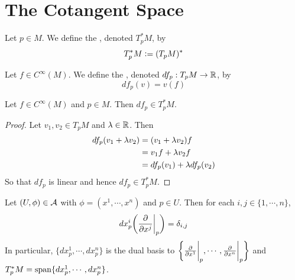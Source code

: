 \documentclass{book}
\begin{document}
	
	
	
	
	
	
	
	
	
	
	
	
	
	
	\newpage
	\section{The Cotangent Space}	
	
	
	\begin{defn}
	Let $p \in M$. We define the , denoted $T^*_pM$, by $$T^*_pM \vcentcolon= (T_pM)^*$$
	\end{defn}
	
	\begin{defn}
	Let $f \in C^{\infty}(M)$. We define the , denoted $df_p:T_pM \rightarrow \mathbb{R}$, by $$df_p(v) = v(f)$$
	\end{defn}
	
	\begin{ex}
	Let $f \in C^{\infty}(M)$ and $p \in M$. Then $df_p \in T^*_pM$.
	\end{ex}
	
	\begin{proof}
	Let $v_1, v_2 \in T_pM$ and $\lambda \in \mathbb{R}$. Then 
	\begin{align*}
	df_p(v_1 + \lambda v_2) 
	& = (v_1 + \lambda v_2) f \\
	& = v_1 f + \lambda v_2 f \\
	& = df_p(v_1) + \lambda df_p(v_2)
	\end{align*}
	So that $df_p$ is linear and hence $df_p \in T^*_pM$.
	\end{proof}
	
	\begin{ex}
		Let $(U, \phi) \in \mathcal{A}$ with $\phi = (x^1, \cdots, x^n)$ and $p \in U$. Then for each $i,j \in \{1, \cdots, n\}$, $$dx^i_p \bigg(\frac{\partial }{\partial x^j} \bigg|_p \bigg) = \delta_{i,j}$$ 
		In particular, $\{dx^1_p, \cdots, dx^n_p \}$ is the dual basis to $\bigg \{ \frac{\partial}{\partial x^1} \bigg|_p, \cdots, \frac{\partial}{\partial x^n} \bigg|_p \bigg \}$ and $T_p^*M = \operatorname{span}\{dx^1_p, \cdots, dx^n_p\}$.
	\end{ex}
\end{document}
